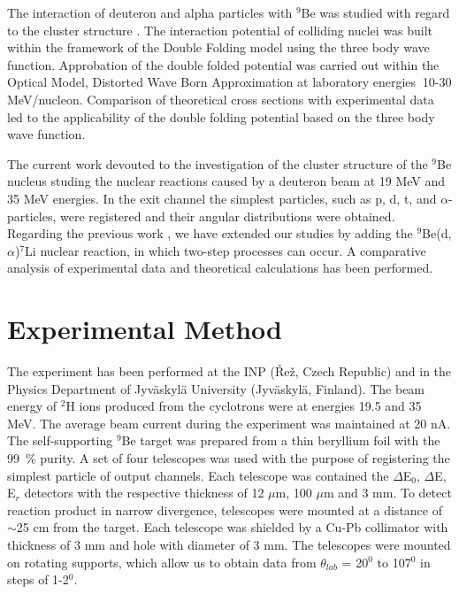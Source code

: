 \documentclass[10pt]{iopart}
\begin{document}
The interaction of deuteron and alpha particles with $^9$Be was studied with regard to the cluster structure \cite{urazbekov2016, urazbekov2017}. The interaction potential of colliding nuclei was built within the framework of the Double Folding model using the three body wave function. Approbation of the double folded potential was carried out within the Optical Model, Distorted Wave Born Approximation at laboratory energies $~$10-30 MeV/nucleon. Comparison of theoretical cross sections with experimental data led to the applicability of the double folding potential based on the three body wave function.

The current work devouted to the investigation of the cluster structure of the $^9$Be nucleus studing the nuclear reactions caused by a deuteron beam at 19 MeV and 35 MeV energies. In the exit channel the simplest particles, such as p, d, t, and $\alpha$-particles, were registered and their angular distributions were obtained. Regarding  the previous work \cite{urazbekov2017}, we have extended our studies by adding the $^9$Be(d,$\alpha$)$^7$Li nuclear reaction, in which  two-step processes can  occur. A comparative analysis of experimental data and theoretical calculations has been performed.
	



\section{Experimental Method}
The experiment has been performed at  the INP (\v{R}e\v{z}, Czech Republic) and  in the Physics Department of Jyv\"{a}skyl\"{a} University (Jyv\"askyl\"a, Finland).  The beam energy of $^2$H ions produced from the cyclotrons were at energies 19.5 and 35 MeV. The average beam current during the experiment was maintained at 20 nA. The self-supporting $^9$Be target was prepared from a thin beryllium foil with the 99~\% purity. A set of four telescopes was used with the purpose of registering the simplest particle of output channels. Each telescope was  contained the $\Delta$E$_0$, $\Delta$E, E$_r$ detectors with the respective thickness of 12 $\mu$m, 100 $\mu$m and 3 mm.
To detect reaction product in narrow divergence,  telescopes were mounted at a distance of $\sim$25 cm from the target. Each telescope was shielded by a Cu-Pb collimator with thickness of 3 mm and hole with diameter of 3 mm. 
The telescopes were mounted on rotating supports, which allow us to obtain data from $\theta_{lab}$ = 20$^{0}$ to 107$^{0}$ in steps of 1-2$^{0}$.
\end{document}
